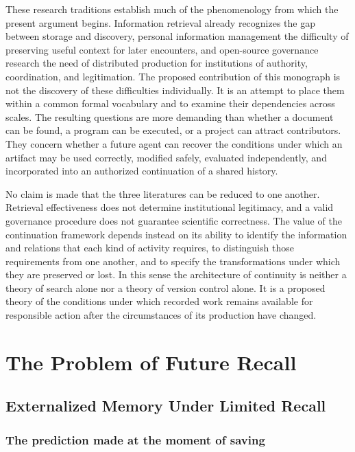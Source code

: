 \documentclass[11pt,twoside,openright]{book}
\theoremstyle{plain}
\theoremstyle{definition}
\theoremstyle{remark}
\begin{document}
These research traditions establish much of the phenomenology from which the present argument begins. Information retrieval already recognizes the gap between storage and discovery, personal information management the difficulty of preserving useful context for later encounters, and open-source governance research the need of distributed production for institutions of authority, coordination, and legitimation. The proposed contribution of this monograph is not the discovery of these difficulties individually. It is an attempt to place them within a common formal vocabulary and to examine their dependencies across scales. The resulting questions are more demanding than whether a document can be found, a program can be executed, or a project can attract contributors. They concern whether a future agent can recover the conditions under which an artifact may be used correctly, modified safely, evaluated independently, and incorporated into an authorized continuation of a shared history.

No claim is made that the three literatures can be reduced to one another. Retrieval effectiveness does not determine institutional legitimacy, and a valid governance procedure does not guarantee scientific correctness. The value of the continuation framework depends instead on its ability to identify the information and relations that each kind of activity requires, to distinguish those requirements from one another, and to specify the transformations under which they are preserved or lost. In this sense the architecture of continuity is neither a theory of search alone nor a theory of version control alone. It is a proposed theory of the conditions under which recorded work remains available for responsible action after the circumstances of its production have changed.

\mainmatter

\part{The Problem of Future Recall}\label{part:recall}

\chapter{Externalized Memory Under Limited Recall}\label{ch:memory}

\section{The prediction made at the moment of saving}
\end{document}

